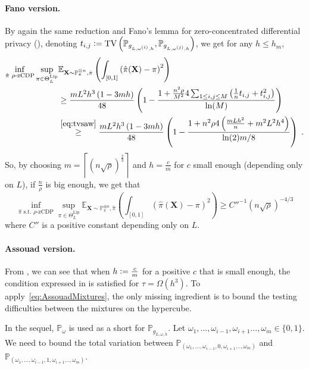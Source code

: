 \documentclass[10pt]{article} %
\newcommand{\Prob}[0]{\mathbb{P}}
\newcommand{\E}[0]{\mathbb{E}}
\newcommand{\eqdef}{\vcentcolon=}
\newcommand\vect[1]{\mathbf{#1}}
\newcommand\tv[2]{\mathrm{TV}\left( {#1}, {#2} \right)}
\newcommand\p[1]{\left( {#1}\right)}
\newcommand\ceil[1]{\left\lceil {#1}\right\rceil}
\begin{document}
\paragraph{Fano version.}
By again the same reduction and Fano's lemma for zero-concentrated differential privacy (), denoting $t_{i, j} \eqdef \tv{\Prob_{g_{L, \omega^{(i)}, h}}}{\Prob_{g_{L, \omega^{(j)}, h}}}$, we get for any $h \leq h_m$,
\begin{equation*}
    \begin{aligned}
    \inf_{\hat{\pi} \text{ $\rho$-zCDP}} \sup_{\pi \in \Theta^{\text{Lip}}_L}
    &\E_{\vect{X} \sim \Prob_{\pi}^{\otimes n}, \hat{\pi}}\p{ \int_{[0, 1]}\p{\hat{\pi}(\vect{X})- \pi}^2} \\
    &\geq 
    \frac{mL^2h^3\p{1 - 3 mh}}{48}
    \p{1 - \frac{1 + \frac{n^2 \rho}{M^2} 4 \sum_{1\leq i, j \leq M} \p{\frac{1}{n} t_{i, j} + t_{i, j}^2}}{\ln (M)}}  \\
    &\stackrel{\eqref{eq:tvsaw}}{\geq }
    \frac{mL^2h^3\p{1 - 3 mh}}{48}
    \p{1 - \frac{1 + n^2 \rho 4 \p{\frac{mLh^2}{n} + m^2 L^2 h^4}}{\ln (2) m / 8}} 
     \;.
    \end{aligned}
\end{equation*}
So, by choosing $m = \ceil{\p{n \sqrt{\rho}}^{
\frac{2}{3}}}$ and $h = \frac{c}{m} $ for $c$ small enough (depending only on $L$), if $\frac{n}{\rho}$ is big enough, we get that 
\begin{equation*}
    \inf_{\hat{\pi} \text{ s.t. } \text{$\rho$-zCDP}} \sup_{\pi \in \Theta^{\text{Lip}}_L}
    \E_{\vect{X} \sim \Prob_{\pi}^{\otimes n}, \hat{\pi}}\p{ \int_{[0, 1]}\p{\hat{\pi}(\vect{X})- \pi}^2} \geq C''^{-1} (n \sqrt{\rho})^{-4/3}
\end{equation*}
where $C''$ is a positive constant depending only on $L$.

\paragraph{Assouad version.}

From , we can see that when $h \eqdef \frac{c}{m}$ for a positive $c$ that is small enough, the condition expressed in  is satisfied for $\tau = \Omega(h^{3})$. To apply~\eqref{eq:AssouadMixtures}, the only missing ingredient is to bound the testing difficulties between the mixtures on the hypercube.

In the sequel, $\Prob_{\omega}$ is used as a short for $\Prob_{g_{L, \omega, h}}$. Let $\omega_1, \dots, \omega_{i-1}, \omega_{i+1} \dots, \omega_{m} \in \{0, 1 \}$. We need to bound the total variation between ${\Prob_{(\omega_1, \dots, \omega_{i-1}, 0, \omega_{i+1} \dots, \omega_{m})}}$ and ${\Prob_{(\omega_1, \dots, \omega_{i-1}, 1, \omega_{i+1} \dots, \omega_{m})}}$.
\end{document}
